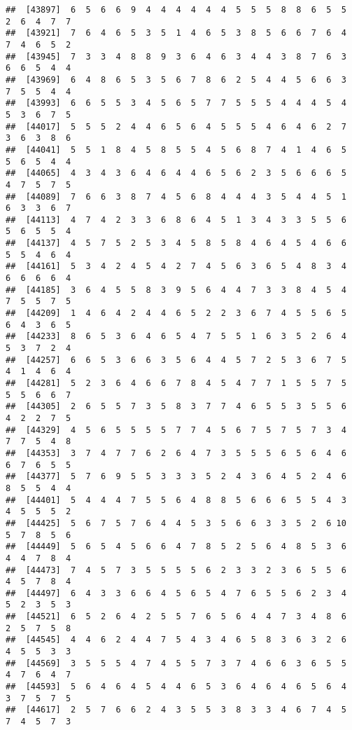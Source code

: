\documentclass[
]{book}
\begin{document}
\begin{verbatim}
##  [43897]  6  5  6  6  9  4  4  4  4  4  4  5  5  5  8  8  6  5  5  2  6  4  7  7
##  [43921]  7  6  4  6  5  3  5  1  4  6  5  3  8  5  6  6  7  6  4  7  4  6  5  2
##  [43945]  7  3  3  4  8  8  9  3  6  4  6  3  4  4  3  8  7  6  3  6  6  5  4  4
##  [43969]  6  4  8  6  5  3  5  6  7  8  6  2  5  4  4  5  6  6  3  7  5  5  4  4
##  [43993]  6  6  5  5  3  4  5  6  5  7  7  5  5  5  4  4  4  5  4  5  3  6  7  5
##  [44017]  5  5  5  2  4  4  6  5  6  4  5  5  5  4  6  4  6  2  7  3  6  3  8  6
##  [44041]  5  5  1  8  4  5  8  5  5  4  5  6  8  7  4  1  4  6  5  5  6  5  4  4
##  [44065]  4  3  4  3  6  4  6  4  4  6  5  6  2  3  5  6  6  6  5  4  7  5  7  5
##  [44089]  7  6  6  3  8  7  4  5  6  8  4  4  4  3  5  4  4  5  1  6  3  3  6  7
##  [44113]  4  7  4  2  3  3  6  8  6  4  5  1  3  4  3  3  5  5  6  5  6  5  5  4
##  [44137]  4  5  7  5  2  5  3  4  5  8  5  8  4  6  4  5  4  6  6  5  5  4  6  4
##  [44161]  5  3  4  2  4  5  4  2  7  4  5  6  3  6  5  4  8  3  4  6  6  6  6  4
##  [44185]  3  6  4  5  5  8  3  9  5  6  4  4  7  3  3  8  4  5  4  7  5  5  7  5
##  [44209]  1  4  6  4  2  4  4  6  5  2  2  3  6  7  4  5  5  6  5  6  4  3  6  5
##  [44233]  8  6  5  3  6  4  6  5  4  7  5  5  1  6  3  5  2  6  4  5  3  7  2  4
##  [44257]  6  6  5  3  6  6  3  5  6  4  4  5  7  2  5  3  6  7  5  4  1  4  6  4
##  [44281]  5  2  3  6  4  6  6  7  8  4  5  4  7  7  1  5  5  7  5  5  5  6  6  7
##  [44305]  2  6  5  5  7  3  5  8  3  7  7  4  6  5  5  3  5  5  6  4  2  2  7  5
##  [44329]  4  5  6  5  5  5  5  7  7  4  5  6  7  5  7  5  7  3  4  7  7  5  4  8
##  [44353]  3  7  4  7  7  6  2  6  4  7  3  5  5  5  6  5  6  4  6  6  7  6  5  5
##  [44377]  5  7  6  9  5  5  3  3  3  5  2  4  3  6  4  5  2  4  6  8  5  5  4  4
##  [44401]  5  4  4  4  7  5  5  6  4  8  8  5  6  6  6  5  5  4  3  4  5  5  5  2
##  [44425]  5  6  7  5  7  6  4  4  5  3  5  6  6  3  3  5  2  6 10  5  7  8  5  6
##  [44449]  5  6  5  4  5  6  6  4  7  8  5  2  5  6  4  8  5  3  6  4  4  7  8  4
##  [44473]  7  4  5  7  3  5  5  5  5  6  2  3  3  2  3  6  5  5  6  4  5  7  8  4
##  [44497]  6  4  3  3  6  6  4  5  6  5  4  7  6  5  5  6  2  3  4  5  2  3  5  3
##  [44521]  6  5  2  6  4  2  5  5  7  6  5  6  4  4  7  3  4  8  6  2  5  7  5  8
##  [44545]  4  4  6  2  4  4  7  5  4  3  4  6  5  8  3  6  3  2  6  4  5  5  3  3
##  [44569]  3  5  5  5  4  7  4  5  5  7  3  7  4  6  6  3  6  5  5  4  7  6  4  7
##  [44593]  5  6  4  6  4  5  4  4  6  5  3  6  4  6  4  6  5  6  4  3  7  5  7  5
##  [44617]  2  5  7  6  6  2  4  3  5  5  3  8  3  3  4  6  7  4  5  7  4  5  7  3

\end{verbatim}
\end{document}
